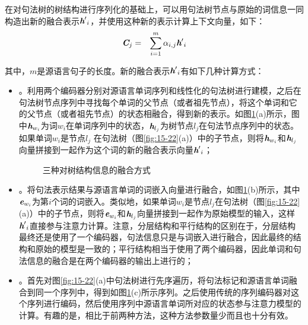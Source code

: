 \parinterval 在对句法树的树结构进行序列化的基础上，可以用句法树节点与原始的词信息一同构造出新的融合表示${\textbf{\em h}'}_i$，并使用这种新的表示计算上下文向量，如下：
\begin{eqnarray}
\textbf{\em C}_j &=& \sum_{i=1}^m \alpha_{i,j} {\textbf{\em h}'}_i
\label{eq:15-56}
\end{eqnarray}

\noindent 其中，$m$是源语言句子的长度。新的融合表示${\textbf{\em h}'}_i$有如下几种计算方式：

\begin{itemize}
\vspace{0.5em}
\item {\small{}}。利用两个编码器分别对源语言单词序列和线性化的句法树进行建模，之后在句法树节点序列中寻找每个单词的父节点（或者祖先节点），将这个单词和它的父节点（或者祖先节点）的状态相融合，得到新的表示。如图\ref{fig:15-23}(a)所示，图中$\textbf{\em h}_{w_i}$为词$w_i$在单词序列中的状态，$\textbf{\em h}_{l_j}$为树节点$l_j$在句法节点序列中的状态。如果单词$w_i$是节点$l_j$ 在句法树（图\ref{fig:15-22}(a)）中的子节点，则将$\textbf{\em h}_{w_i}$和$\textbf{\em h}_{l_j}$向量拼接到一起作为这个词的新的融合表示向量${\textbf{\em h}'}_i$；
\vspace{0.5em}

\begin{figure}[htp]
\centering



\caption{三种对树结构信息的融合方式}
\label{fig:15-23}
\end{figure}

\item {\small{}}。将句法表示结果与源语言单词的词嵌入向量进行融合，如图\ref{fig:15-23}(b)所示，其中$\textbf{\em e}_{w_i}$为第$i$个词的词嵌入。类似地，如果单词$w_i$是节点$l_j$在句法树（图\ref{fig:15-22}(a)）中的子节点，则将$\textbf{\em e}_{w_i}$和$\textbf{\em h}_{l_j}$向量拼接到一起作为原始模型的输入，这样${\textbf{\em h}'}_i$直接参与注意力计算。注意，分层结构和平行结构的区别在于，分层结构最终还是使用了一个编码器，句法信息只是与词嵌入进行融合，因此最终的结构和原始的模型是一致的；平行结构相当于使用了两个编码器，因此单词和句法信息的融合是在两个编码器的输出上进行的；
\vspace{0.5em}
\item {\small{}}。首先对图\ref{fig:15-22}(a)中句法树进行先序遍历，将句法标记和源语言单词融合到同一个序列中，得到如图\ref{fig:15-23}(c)所示序列。之后使用传统的序列编码器对这个序列进行编码，然后使用序列中源语言单词所对应的状态参与注意力模型的计算。有趣的是，相比于前两种方法，这种方法参数量少而且也十分有效。
\vspace{0.5em}
\end{itemize}

